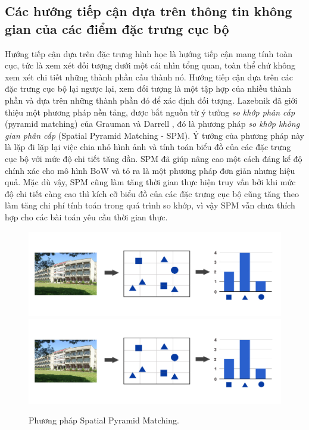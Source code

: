 \subsection{Các hướng tiếp cận dựa trên thông tin không gian của các điểm đặc trưng cục bộ}
\label{spm}

Hướng tiếp cận dựa trên đặc trưng hình học là hướng tiếp cận mang tính toàn cục, tức là xem xét đối tượng dưới một cái nhìn tổng quan, toàn thể chứ không xem xét chi tiết những thành phần cấu thành nó. Hướng tiếp cận dựa trên các đặc trưng cục bộ lại ngược lại, xem đối tượng là một tập hợp của nhiều thành phần và dựa trên những thành phần đó để xác định đối tượng. Lazebnik \cite{lazebnik2006beyond} đã giới thiệu một phương pháp nền tảng, được bắt nguồn từ ý tưởng \textit{so khớp phân cấp} (pyramid matching) của Grauman và Darrell \cite{grauman2005pyramid}, đó là phương pháp \textit{so khớp không gian phân cấp} (Spatial Pyramid Matching - SPM). Ý tưởng của phương pháp này là lặp đi lặp lại việc chia nhỏ hình ảnh và tính toán biểu đồ của các đặc trưng cục bộ với mức độ chi tiết tăng dần. SPM đã giúp nâng cao một cách đáng kể độ chính xác cho mô hình BoW và tỏ ra là một phương pháp đơn giản nhưng hiệu quả. Mặc dù vậy, SPM cũng làm tăng thời gian thực hiện truy vấn bởi khi mức độ chi tiết càng cao thì kích cỡ biểu đồ của các đặc trưng cục bộ cũng tăng theo làm tăng chi phí tính toán trong quá trình so khớp, vì vậy SPM vẫn chưa thích hợp cho các bài toán yêu cầu thời gian thực.

\begin{figure}[!htbp]
  \begin{center}
    \leavevmode
    \ifpdf
      \includegraphics[scale=0.45]{bow-preview}
    \else
      \includegraphics[scale=0.45]{bow-preview}
    \fi
    \caption[Phương pháp Spatial Pyramid Matching]{Phương pháp Spatial Pyramid Matching.}
    \label{FigSPM}
  \end{center}
\end{figure}

